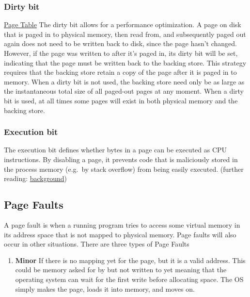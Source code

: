\begin{enumerate}
\subsubsection{Dirty bit}

\href{http://en.wikipedia.org/wiki/Page\_table\#Page\_table\_data}{Page Table} The dirty bit allows for a performance optimization. A page on disk that is paged in to physical memory, then read from, and subsequently paged out again does not need to be written back to disk, since the page hasn't changed. However, if the page was written to after it's paged in, its dirty bit will be set, indicating that the page must be written back to the backing store. This strategy requires that the backing store retain a copy of the page after it is paged in to memory. When a dirty bit is not used, the backing store need only be as large as the instantaneous total size of all paged-out pages at any moment. When a dirty bit is used, at all times some pages will exist in both physical memory and the backing store.

\subsubsection{Execution bit}\label{execution-bit}
The execution bit defines whether bytes in a page can be executed as CPU instructions. By disabling a page, it prevents code that is maliciously stored in the process memory (e.g.~by stack overflow) from being easily executed. (further reading: \href{http://en.wikipedia.org/wiki/NX\_bit\#Hardware\_background}{background})

\subsection{Page Faults}

 A page fault is when a running program tries to access some virtual memory in its address space that is not mapped to physical memory. Page faults will also occur in other situations. There are three types of Page Faults

\begin{enumerate}
 \item \textbf{Minor} If there is no mapping yet for the page, but it is a valid address. This could be memory asked for by  but not written to yet meaning that the operating system can wait for the first write before allocating space. The OS simply makes the page, loads it into memory, and moves on.


\end{enumerate}
\end{enumerate}
